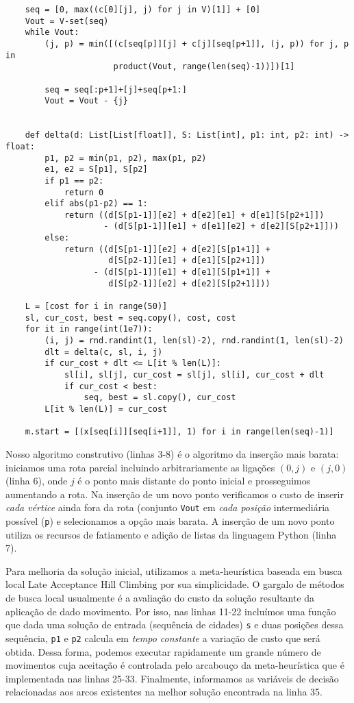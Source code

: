 \documentclass[a4paper,11pt,fleqn]{article}
\begin{document}
\begin{verbatim}
    seq = [0, max((c[0][j], j) for j in V)[1]] + [0]
    Vout = V-set(seq)
    while Vout:
        (j, p) = min([(c[seq[p]][j] + c[j][seq[p+1]], (j, p)) for j, p in
                      product(Vout, range(len(seq)-1))])[1]

        seq = seq[:p+1]+[j]+seq[p+1:]    
        Vout = Vout - {j}


    def delta(d: List[List[float]], S: List[int], p1: int, p2: int) -> float:
        p1, p2 = min(p1, p2), max(p1, p2)
        e1, e2 = S[p1], S[p2]
        if p1 == p2:
            return 0
        elif abs(p1-p2) == 1:
            return ((d[S[p1-1]][e2] + d[e2][e1] + d[e1][S[p2+1]])
                    - (d[S[p1-1]][e1] + d[e1][e2] + d[e2][S[p2+1]]))
        else:
            return ((d[S[p1-1]][e2] + d[e2][S[p1+1]] + 
                     d[S[p2-1]][e1] + d[e1][S[p2+1]])
                  - (d[S[p1-1]][e1] + d[e1][S[p1+1]] + 
                     d[S[p2-1]][e2] + d[e2][S[p2+1]]))

    L = [cost for i in range(50)]
    sl, cur_cost, best = seq.copy(), cost, cost
    for it in range(int(1e7)):
        (i, j) = rnd.randint(1, len(sl)-2), rnd.randint(1, len(sl)-2)
        dlt = delta(c, sl, i, j)
        if cur_cost + dlt <= L[it % len(L)]:
            sl[i], sl[j], cur_cost = sl[j], sl[i], cur_cost + dlt
            if cur_cost < best:
                seq, best = sl.copy(), cur_cost
        L[it % len(L)] = cur_cost
        
    m.start = [(x[seq[i]][seq[i+1]], 1) for i in range(len(seq)-1)]    
\end{verbatim}

Nosso algoritmo construtivo (linhas 3-8) é o algoritmo da inserção mais barata: iniciamos uma rota parcial incluindo arbitrariamente as ligações $(0, j)$ e $(j, 0)$ (linha 6), onde $j$ é o ponto mais distante do ponto inicial e prosseguimos aumentando a rota. Na inserção de um novo ponto verificamos o custo de inserir \emph{cada vértice} ainda fora da rota (conjunto \texttt{Vout} em \emph{cada posição} intermediária possível (\texttt{p}) e selecionamos a opção mais barata. A inserção de um novo ponto utiliza os recursos de fatiamento e adição de listas da linguagem Python (linha 7).

Para melhoria da solução inicial, utilizamos a meta-heurística baseada em busca local Late Acceptance Hill Climbing \citep{burke2017} por sua simplicidade. O gargalo de métodos de busca local usualmente é a avaliação do custo da solução resultante da aplicação de dado movimento. Por isso, nas linhas 11-22 incluímos uma função que dada uma solução de entrada (sequência de cidades) \texttt{s} e duas posições dessa sequência, \texttt{p1} e \texttt{p2} calcula em \emph{tempo constante} a variação de custo que será obtida. Dessa forma, podemos executar rapidamente um grande número de movimentos cuja aceitação é controlada pelo arcabouço da meta-heurística que é implementada nas linhas 25-33. Finalmente, informamos as variáveis de decisão relacionadas aos arcos existentes na melhor solução encontrada na linha 35.
\end{document}
